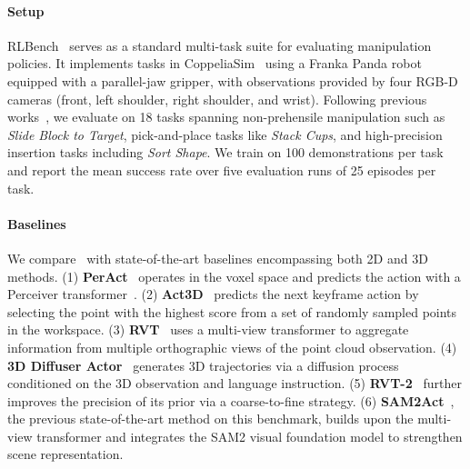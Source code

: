 \paragraph{Setup} 
RLBench~\cite{james2020rlbench} serves as a standard multi-task suite for evaluating manipulation policies.
It implements tasks in CoppeliaSim~\cite{rohmer2013v} using a Franka Panda robot equipped with a parallel-jaw gripper, with observations provided by four RGB-D cameras (front, left shoulder, right shoulder, and wrist). 
Following previous works~\cite{shridhar2023perceiver,goyal2023rvt,goyal2024rvt}, we evaluate on 18 tasks spanning non-prehensile manipulation such as \textit{Slide Block to Target}, pick-and-place tasks like \textit{Stack Cups}, and high-precision insertion tasks including \textit{Sort Shape}. 
We train on 100 demonstrations per task and report the mean success rate over five evaluation runs of 25 episodes per task.

\paragraph{Baselines}
We compare \method\ with state-of-the-art baselines encompassing both 2D and 3D methods.
(1) \textbf{PerAct}~\cite{shridhar2023perceiver} operates in the voxel space and predicts the action with a Perceiver transformer~\cite{jaegleperceiver}.
(2) \textbf{Act3D}~\cite{gervet2023act3d} predicts the next keyframe action by selecting the point with the highest score from a set of randomly sampled points in the workspace.
(3) \textbf{RVT}~\cite{goyal2023rvt} uses a multi-view transformer to aggregate information from multiple orthographic views of the point cloud observation.
(4) \textbf{3D Diffuser Actor}~\cite{3d-da} generates 3D trajectories via a diffusion process conditioned on the 3D observation and language instruction.
(5) \textbf{RVT-2}~\cite{goyal2024rvt} further improves the precision of its prior via a coarse-to-fine strategy.
(6) \textbf{SAM2Act}~\cite{fang2025sam2act}, the previous state-of-the-art method on this benchmark, builds upon the multi-view transformer and integrates the SAM2 visual foundation model to strengthen scene representation.

